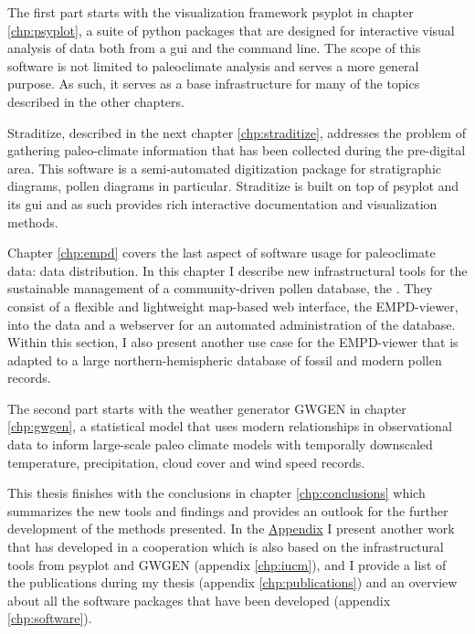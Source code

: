 \begin{refsection}
The first part starts with the visualization framework psyplot in chapter \ref{chp:psyplot}, a suite of python packages that are designed for interactive visual analysis of data both from a \gls{gui} and the command line. The scope of this software is not limited to paleoclimate analysis and serves a more general purpose. As such, it serves as a base infrastructure for many of the topics described in the other chapters.

Straditize, described in the next chapter \ref{chp:straditize}, addresses the problem of gathering paleo-climate information that has been collected during the pre-digital area. This software is a semi-automated digitization package for stratigraphic diagrams, pollen diagrams in particular. Straditize is built on top of psyplot and its \gls{gui} and as such provides rich interactive documentation and visualization methods.

Chapter \ref{chp:empd} covers the last aspect of software usage for paleoclimate data: data distribution. In this chapter I describe new infrastructural tools for the sustainable management of a community-driven pollen database, the . They consist of a flexible and lightweight map-based web interface, the EMPD-viewer, into the data and a webserver for an automated administration of the database. Within this section, I also present another use case for the EMPD-viewer that is adapted to a large northern-hemispheric database of fossil and modern pollen records.

The second part starts with the weather generator GWGEN in chapter \ref{chp:gwgen}, a statistical model that uses modern relationships in observational data to inform large-scale paleo climate models with temporally downscaled temperature, precipitation, cloud cover and wind speed records.


This thesis finishes with the conclusions in chapter \ref{chp:conclusions} which summarizes the new tools and findings and provides an outlook for the further development of the methods presented. In the \hyperlink{appendix}{Appendix} I present another work that has developed in a cooperation which is also based on the infrastructural tools from psyplot and GWGEN (appendix \ref{chp:iucm}), and I provide a list of the publications during my thesis (appendix \ref{chp:publications}) and an overview about all the software packages that have been developed (appendix \ref{chp:software}).

\printbibliography[heading=subbibintoc]

\end{refsection}
